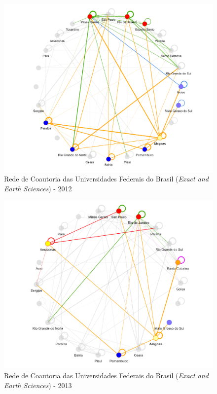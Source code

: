\begin{figure}[H]
	\centering
	\includegraphics[width=\linewidth]{Imagens/rede-exact-AL-2012.pdf}
	\caption{Rede de Coautoria das Universidades Federais do Brasil (\textit{Exact and Earth Sciences}) - 2012}
	\label{Rede de Coautoria - UF EXACT AL 2012}
\end{figure}

\begin{figure}[H]
	\centering
	\includegraphics[width=\linewidth]{Imagens/rede-exact-AL-2013.pdf}
	\caption{Rede de Coautoria das Universidades Federais do Brasil (\textit{Exact and Earth Sciences}) - 2013}
	\label{Rede de Coautoria - UF EXACT AL 2013}
\end{figure}

